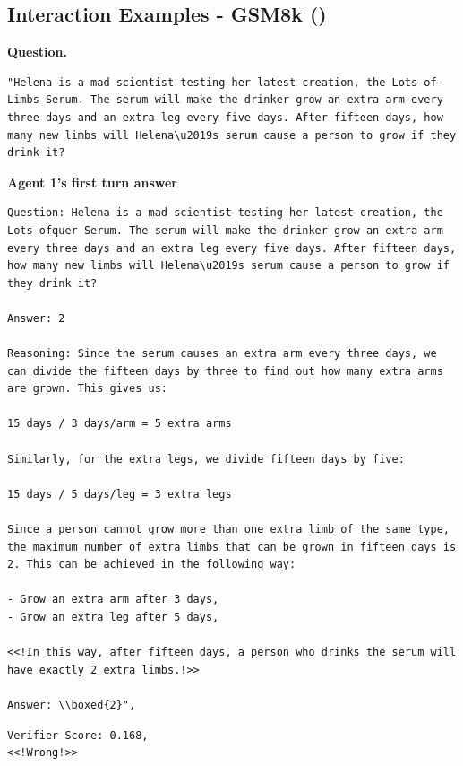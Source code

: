 \subsection{Interaction Examples - GSM8k  ()}
\textbf{Question. }
\begin{lstlisting}[breaklines=true]
"Helena is a mad scientist testing her latest creation, the Lots-of-Limbs Serum. The serum will make the drinker grow an extra arm every three days and an extra leg every five days. After fifteen days, how many new limbs will Helena\u2019s serum cause a person to grow if they drink it?
\end{lstlisting}
\textbf{Agent 1's first turn answer} 
\begin{lstlisting}[breaklines=true]
Question: Helena is a mad scientist testing her latest creation, the Lots-ofquer Serum. The serum will make the drinker grow an extra arm every three days and an extra leg every five days. After fifteen days, how many new limbs will Helena\u2019s serum cause a person to grow if they drink it?

Answer: 2

Reasoning: Since the serum causes an extra arm every three days, we can divide the fifteen days by three to find out how many extra arms are grown. This gives us:

15 days / 3 days/arm = 5 extra arms

Similarly, for the extra legs, we divide fifteen days by five:

15 days / 5 days/leg = 3 extra legs

Since a person cannot grow more than one extra limb of the same type, the maximum number of extra limbs that can be grown in fifteen days is 2. This can be achieved in the following way:

- Grow an extra arm after 3 days,
- Grow an extra leg after 5 days,

<<!In this way, after fifteen days, a person who drinks the serum will have exactly 2 extra limbs.!>>

Answer: \\boxed{2}",

\end{lstlisting}
\begin{lstlisting}
Verifier Score: 0.168,
<<!Wrong!>> 
\end{lstlisting}

